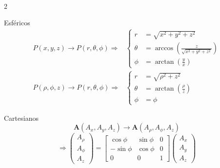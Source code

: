 \begin{multicols}{2}
\begin{itemform}[leftmargin=*,noitemsep,topsep=0pt]
                        \item Esféricos
                          $$
                          \begin{aligned}
                            P(x,y,z) \to P(r,\theta,\phi) \Rightarrow
                            &\left\{
                              \begin{aligned}
                                r&=\sqrt{x^2+y^2+z^2}\\
                                \theta &= \arccos\left(\frac{z}{\sqrt{x^2+y^2+z^2}}\right)\\
                                \phi &= \arctan\left(\frac{y}{x}\right)
                              \end{aligned} \right.\\
                              P(\rho,\phi,z) \to P(r,\theta,\phi) \Rightarrow
                              &\left\{
                                \begin{aligned}
                                  r&=\sqrt{\rho^2+z^2}\\
                                  \theta &= \arctan\left(\frac{\rho}{z}\right)\\
                                  \phi &= \phi
                                \end{aligned} \right.
                              \end{aligned}
                              $$
                            \end{itemform}
                            \columnbreak
                            \begin{itemform}
                            \item Cartesianos
                              $$\mathbf{A}(A_x, A_y, A_z) \to \mathbf{A}(A_\rho, A_\phi, A_z)$$
                              $$\Rightarrow
                              \begin{pmatrix}
                                A_\rho \\
                                A_\phi \\
                                A_z
                              \end{pmatrix}
                              =
                              \begin{bmatrix}
                                \cos\phi & \sin\phi & 0 \\
                                -\sin\phi & \cos\phi & 0 \\
                                0 & 0 & 1
                              \end{bmatrix}
                              \begin{pmatrix}
                                A_x \\
                                A_y \\
                                A_z
                              \end{pmatrix}
                              $$


\end{itemform}
\end{multicols}
